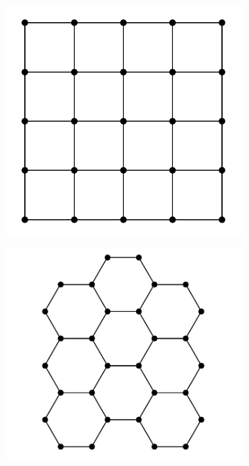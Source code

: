 \begin{figure}[t]
  \centering
  \begin{subfigure}{.32\textwidth}
    \centering
    \includegraphics[width=1.0\linewidth]{figures/square.png}
    \label{fig:rt-square}
  \end{subfigure}
  \begin{subfigure}{.32\textwidth}
    \centering
    \includegraphics[width=1.0\linewidth]{figures/hex.png}

\end{subfigure}
\end{figure}
